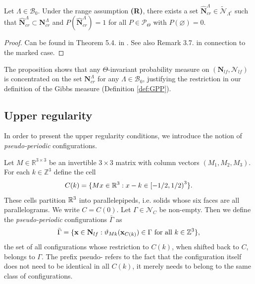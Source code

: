 \begin{proposition}\label{prop:cr-a.s.}
Let $\Lambda \in \mathcal B_0$. Under the range assumption \textbf{(R)}, there exists a set $\hat {\mathbf N}^\Lambda_{cr} \in \tilde {\mathcal N}_{\Lambda^c}$ such that $\hat {\mathbf N}^\Lambda_{cr} \subset \mathbf N^\Lambda_{cr}$ and $P(\hat {\mathbf N}^\Lambda_{cr})=1$ for all $P \in \mathcal P_\Theta$ with $P(\varnothing)=0$.
\end{proposition}
\begin{proof}
	Can be found in Theorem 5.4. in \cite{DDG12}. See also Remark 3.7. in connection to the marked case.
\end{proof}

The proposition shows that any $\Theta$-invariant probability measure on $(\mathbf N_{lf},\mathcal N_{lf})$ is concentrated on the set $\mathbf N^\Lambda_{cr}$ for any $\Lambda \in \mathcal B_0$, justifying the restriction in our definition of the Gibbs measure (Definition \ref{def:GPP}).  

\subsection{Upper regularity}\label{sec:upperregularity}


In order to present the upper regularity conditions, we introduce the notion of \textit{pseudo-periodic} configurations. 

Let $M\in\mathbb R^{3\times 3}$ be an invertible $3\times 3$ matrix with column vectors $(M_1,M_2,M_3)$. For each $k \in \mathbb Z^3$ define the cell
$$C(k) =  \{Mx \in {\mathbb R^3}: x-k \in \left[ -1/2, 1/2 \right)^3 \}.$$
These cells partition ${\mathbb R^3}$ into parallelepipeds, i.e. solids whose six faces are all parallelograms. We write $C=C(0)$. Let $\Gamma \in \mathcal N_C$ be non-empty. Then we define the \textit{pseudo-periodic} configurations $\bar \Gamma$ as
$$\bar \Gamma = \{ {\mathbf{x}} \in \mathbf N_{lf}: \vartheta_{Mk}({\mathbf{x}}_{C(k)}) \in \Gamma \text{ for all } k \in \mathbb Z^3 \},$$
the set of all configurations whose restriction to $C(k)$, when shifted back to $C$, belongs to $\Gamma$. The prefix pseudo- refers to the fact that the configuration itself does not need to be identical in all $C(k)$, it merely needs to belong to the same class of configurations.

